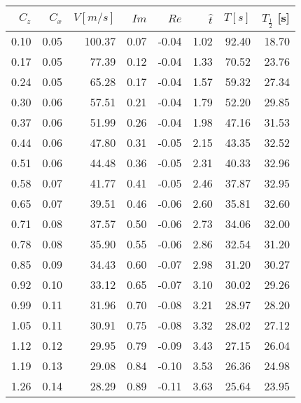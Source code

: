 \begin{tabular}{rrrrrrrr}
   \toprule
    $C_z$ &  $C_x$ &  $V [m/s]$ &  $Im$ &  $Re$ &  $\hat t$ &  $T [s]$ &  $T_{\frac{1}{2}}$ [s] \\
   \midrule
     0.10 &   0.05 &   100.37 &  0.07 & -0.04 &      1.02 &    92.40 &                  18.70 \\
     0.17 &   0.05 &    77.39 &  0.12 & -0.04 &      1.33 &    70.52 &                  23.76 \\
     0.24 &   0.05 &    65.28 &  0.17 & -0.04 &      1.57 &    59.32 &                  27.34 \\
     0.30 &   0.06 &    57.51 &  0.21 & -0.04 &      1.79 &    52.20 &                  29.85 \\
     0.37 &   0.06 &    51.99 &  0.26 & -0.04 &      1.98 &    47.16 &                  31.53 \\
     0.44 &   0.06 &    47.80 &  0.31 & -0.05 &      2.15 &    43.35 &                  32.52 \\
     0.51 &   0.06 &    44.48 &  0.36 & -0.05 &      2.31 &    40.33 &                  32.96 \\
     0.58 &   0.07 &    41.77 &  0.41 & -0.05 &      2.46 &    37.87 &                  32.95 \\
     0.65 &   0.07 &    39.51 &  0.46 & -0.06 &      2.60 &    35.81 &                  32.60 \\
     0.71 &   0.08 &    37.57 &  0.50 & -0.06 &      2.73 &    34.06 &                  32.00 \\
     0.78 &   0.08 &    35.90 &  0.55 & -0.06 &      2.86 &    32.54 &                  31.20 \\
     0.85 &   0.09 &    34.43 &  0.60 & -0.07 &      2.98 &    31.20 &                  30.27 \\
     0.92 &   0.10 &    33.12 &  0.65 & -0.07 &      3.10 &    30.02 &                  29.26 \\
     0.99 &   0.11 &    31.96 &  0.70 & -0.08 &      3.21 &    28.97 &                  28.20 \\
     1.05 &   0.11 &    30.91 &  0.75 & -0.08 &      3.32 &    28.02 &                  27.12 \\
     1.12 &   0.12 &    29.95 &  0.79 & -0.09 &      3.43 &    27.15 &                  26.04 \\
     1.19 &   0.13 &    29.08 &  0.84 & -0.10 &      3.53 &    26.36 &                  24.98 \\
     1.26 &   0.14 &    28.29 &  0.89 & -0.11 &      3.63 &    25.64 &                  23.95 \\

\end{tabular}
